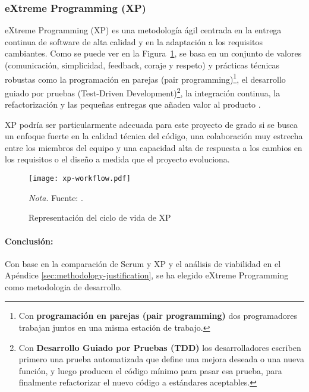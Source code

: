 \subsubsection{eXtreme Programming (XP)}
eXtreme Programming (XP) es una metodología ágil centrada en la entrega continua de software de alta calidad y en la adaptación a los requisitos cambiantes.
Como se puede ver en la Figura~\ref{fig:xpWorkflowA}, se basa en un conjunto de valores (comunicación, simplicidad, feedback, coraje y respeto) y prácticas técnicas robustas como la programación en parejas (pair programming)\footnote{Con \textbf{programación en parejas (pair programming)} dos programadores trabajan juntos en una misma estación de trabajo.}, el desarrollo guiado por pruebas (Test-Driven Development)\footnote{Con \textbf{Desarrollo Guiado por Pruebas (TDD)} los desarrolladores escriben primero una prueba automatizada que define una mejora deseada o una nueva función, y luego producen el código mínimo para pasar esa prueba, para finalmente refactorizar el nuevo código a estándares aceptables.}, la integración continua, la refactorización y las pequeñas entregas que añaden valor al producto \parencite{Beck2004}.

XP podría ser particularmente adecuada para este proyecto de grado si se busca un enfoque fuerte en la calidad técnica del código, una colaboración muy estrecha entre los miembros del equipo y una capacidad alta de respuesta a los cambios en los requisitos o el diseño a medida que el proyecto evoluciona.

\begin{figure}
    \centering
    \caption{Representación del ciclo de vida de XP}\label{fig:xpWorkflowA}
    \texttt{[image: xp-workflow.pdf]}

    \vspace{0.5em}
    \begin{minipage}{\textwidth}
        \small\textit{Nota.} Fuente: \textcite{abrahamsson2017agile}.
    \end{minipage}
\end{figure}

\paragraph{Conclusión:}
Con base en la comparación de Scrum y XP y el análisis de viabilidad en el Apéndice \ref{sec:methodology-justification}, se ha elegido eXtreme Programming como metodologia de desarrollo.
